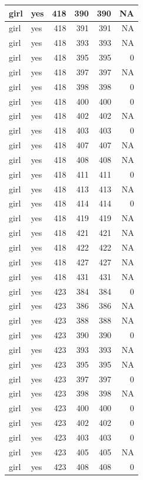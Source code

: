 \documentclass[man]{apa6}
\begin{document}
\begin{tabular}{l|l|r|r|r|r}
\hline
girl & yes & 418 & 390 & 390 & NA\\
\hline
girl & yes & 418 & 391 & 391 & NA\\
\hline
girl & yes & 418 & 393 & 393 & NA\\
\hline
girl & yes & 418 & 395 & 395 & 0\\
\hline
girl & yes & 418 & 397 & 397 & NA\\
\hline
girl & yes & 418 & 398 & 398 & 0\\
\hline
girl & yes & 418 & 400 & 400 & 0\\
\hline
girl & yes & 418 & 402 & 402 & NA\\
\hline
girl & yes & 418 & 403 & 403 & 0\\
\hline
girl & yes & 418 & 407 & 407 & NA\\
\hline
girl & yes & 418 & 408 & 408 & NA\\
\hline
girl & yes & 418 & 411 & 411 & 0\\
\hline
girl & yes & 418 & 413 & 413 & NA\\
\hline
girl & yes & 418 & 414 & 414 & 0\\
\hline
girl & yes & 418 & 419 & 419 & NA\\
\hline
girl & yes & 418 & 421 & 421 & NA\\
\hline
girl & yes & 418 & 422 & 422 & NA\\
\hline
girl & yes & 418 & 427 & 427 & NA\\
\hline
girl & yes & 418 & 431 & 431 & NA\\
\hline
girl & yes & 423 & 384 & 384 & 0\\
\hline
girl & yes & 423 & 386 & 386 & NA\\
\hline
girl & yes & 423 & 388 & 388 & NA\\
\hline
girl & yes & 423 & 390 & 390 & 0\\
\hline
girl & yes & 423 & 393 & 393 & NA\\
\hline
girl & yes & 423 & 395 & 395 & NA\\
\hline
girl & yes & 423 & 397 & 397 & 0\\
\hline
girl & yes & 423 & 398 & 398 & NA\\
\hline
girl & yes & 423 & 400 & 400 & 0\\
\hline
girl & yes & 423 & 402 & 402 & 0\\
\hline
girl & yes & 423 & 403 & 403 & 0\\
\hline
girl & yes & 423 & 405 & 405 & NA\\
\hline
girl & yes & 423 & 408 & 408 & 0\\

\end{tabular}
\end{document}
